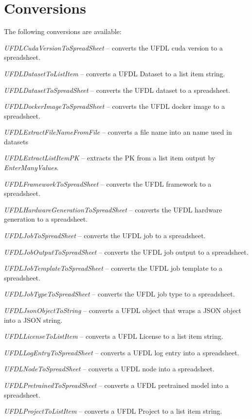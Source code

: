 \documentclass[a4paper]{book}
\begin{document}
\section{Conversions}
The following conversions are available:
\begin{tight_itemize}
  \item \textit{UFDLCudaVersionToSpreadSheet} -- converts the UFDL cuda version to a spreadsheet.
  \item \textit{UFDLDatasetToListItem} -- converts a UFDL Dataset to a list item string.
  \item \textit{UFDLDatasetToSpreadSheet} -- converts the UFDL dataset to a spreadsheet.
  \item \textit{UFDLDockerImageToSpreadSheet} -- converts the UFDL docker image to a spreadsheet.
  \item \textit{UFDLExtractFileNameFromFile} -- converts a file name into an name used in datasets
  \item \textit{UFDLExtractListItemPK} -- extracts the PK from a list item output by \textit{EnterManyValues}.
  \item \textit{UFDLFrameworkToSpreadSheet} -- converts the UFDL framework to a spreadsheet.
  \item \textit{UFDLHardwareGenerationToSpreadSheet} -- converts the UFDL hardware generation to a spreadsheet.
  \item \textit{UFDLJobToSpreadSheet} -- converts the UFDL job to a spreadsheet.
  \item \textit{UFDLJobOutputToSpreadSheet} -- converts the UFDL job output to a spreadsheet.
  \item \textit{UFDLJobTemplateToSpreadSheet} -- converts the UFDL job template to a spreadsheet.
  \item \textit{UFDLJobTypeToSpreadSheet} -- converts the UFDL job type to a spreadsheet.
  \item \textit{UFDLJsonObjectToString} -- converts a UFDL object that wraps a JSON object into a JSON string.
  \item \textit{UFDLLicenseToListItem} -- converts a UFDL License to a list item string.
  \item \textit{UFDLLogEntryToSpreadSheet} -- converts a UFDL log entry into a spreadsheet.
  \item \textit{UFDLNodeToSpreadSheet} -- converts a UFDL node into a spreadsheet.
  \item \textit{UFDLPretrainedToSpreadSheet} -- converts a UFDL pretrained model into a spreadsheet.
  \item \textit{UFDLProjectToListItem} -- converts a UFDL Project to a list item string.

\end{tight_itemize}
\end{document}
